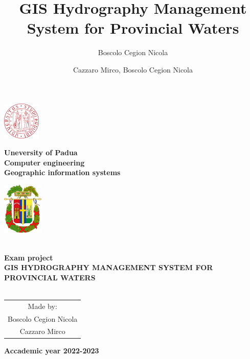 \documentclass[a4paper, 11pt]{article}
\title{GIS Hydrography Management System for Provincial Waters}
\author{Boscolo Cegion Nicola}
\author{Cazzaro Mirco, Boscolo Cegion Nicola}
\date{}
\begin{document}
\begin{center}
	\begin{minipage}{2.5cm}
	\begin{center}
		\includegraphics[height=1.8cm]{img/unipd.png}
		
	\end{center}
\end{minipage}\hfill
\begin{minipage}{10cm}
	\begin{center}
	\textbf{Uneversity of Padua}\\[0.1cm]
    \textbf{Computer engineering}\\[0.1cm]
    \textbf{Geographic information systems}


	\end{center}
\end{minipage}\hfill
\begin{minipage}{2.5cm}
	\begin{center}
		\includegraphics[height=2.5cm]{img/belluno.png}
	\end{center}

\end{minipage}



\textsc{\Large }\\[1.5cm]
{\large \bfseries Exam project}\\[4.5cm]


{\huge \bfseries \uppercase{GIS Hydrography Management System for Provincial Waters} \\[0.5cm] }
\textsc{\Large }\\[2.5cm]







\begin{tabular}{c}
    Made by:\\[0.5cm]
    {\LARGE Boscolo Cegion Nicola}\\[0.1cm]
    {\LARGE Cazzaro Mirco}\\[0.1cm]
    
\end{tabular}
\vfill

{\textbf{\large {Accademic year} 2022-2023}}

\end{center}
\end{document}
